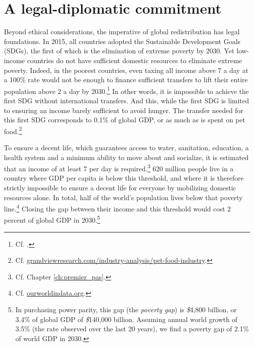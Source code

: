 \documentclass[a5paper,english,openany]{memoir}
\begin{document}
\section*{A legal-diplomatic commitment}
Beyond ethical considerations, the imperative of global redistribution has legal foundations. In 2015, all countries adopted the Sustainable Development Goals (SDGs), the first 
of which is the elimination of extreme poverty by 2030. Yet low-income countries do not have sufficient domestic resources to eliminate extreme poverty. Indeed, in the poorest countries, even taxing %
all income above 7\textit{\texteuro} a day at a 100\% rate %
would not be enough to finance sufficient transfers to lift their entire population above 2\textit{\texteuro} a day by 2030.\footnote{Cf. \citet{fabre_shortfall_2024}.} %
In other words, it is impossible to achieve the first SDG without international transfers. And this, while the first SDG is limited to ensuring an income barely sufficient to avoid hunger. %
The transfer needed for this first SDG corresponds to 0.1\% of global GDP, or as much as is spent on pet food.\footnote{Cf. \href{https://www.grandviewresearch.com/industry-analysis/pet-food-industry}{grandviewresearch.com/industry-analysis/pet-food-industry}.} %

To ensure a decent life, which guarantees access to water, sanitation, education, a health system and a minimum ability to move about and socialize, %
it is estimated that an income of at least \textit{\texteuro{}}7 per day is required.\footnote{Cf. Chapter \ref{ch:premier_pas}.} 
620 million people live in a country where GDP per capita is below this threshold, and where it is therefore strictly impossible to ensure a decent life for everyone by mobilizing domestic resources alone. %
In total, half of the world's population lives below that poverty line.\footnote{Cf. \href{https://ourworldindata.org/grapher/distribution-of-population-between-different-poverty-thresholds-up-to-30-dollars}{ourworldindata.org}.} Closing the gap between their income and this threshold would cost 2 percent of global GDP in 2030.\footnote{In purchasing power parity, this gap (the \textit{poverty gap}) is \textit{\$}4,800 billion, or 3.4\% of global GDP of \textit{\$}140,000 billion. Assuming annual world growth of 3.5\% (the rate observed over the last 20 years), we find a poverty gap of 
2.1\% of world GDP in 2030.} %
\end{document}
